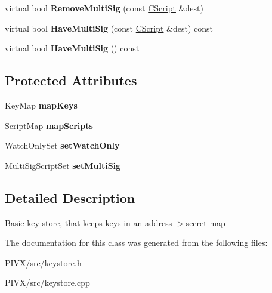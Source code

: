 \begin{DoxyCompactItemize}
\mbox{\label{class_c_basic_key_store_afebb995b8c69e4123bf1962f2de9cc52}} 
virtual bool {\bfseries Remove\+Multi\+Sig} (const \mbox{\hyperlink{class_c_script}{C\+Script}} \&dest)
\item 
\mbox{\label{class_c_basic_key_store_aeed4e62f08102fa2b1f6db4ec07b2bf3}} 
virtual bool {\bfseries Have\+Multi\+Sig} (const \mbox{\hyperlink{class_c_script}{C\+Script}} \&dest) const
\item 
\mbox{\label{class_c_basic_key_store_a5ad58081dedd56a2706b8dcca96460d0}} 
virtual bool {\bfseries Have\+Multi\+Sig} () const
\end{DoxyCompactItemize}
\subsection*{Protected Attributes}
\begin{DoxyCompactItemize}
\item 
\mbox{\label{class_c_basic_key_store_ac520003e5c3d863bf71fde247c6e0672}} 
Key\+Map {\bfseries map\+Keys}
\item 
\mbox{\label{class_c_basic_key_store_a8e9fa81382129c1535a0ee7b0d9c8f3b}} 
Script\+Map {\bfseries map\+Scripts}
\item 
\mbox{\label{class_c_basic_key_store_ac3391cb491e315403ad9af6afd1313da}} 
Watch\+Only\+Set {\bfseries set\+Watch\+Only}
\item 
\mbox{\label{class_c_basic_key_store_abf343356a152df521b10941b8daa72cf}} 
Multi\+Sig\+Script\+Set {\bfseries set\+Multi\+Sig}
\end{DoxyCompactItemize}


\subsection{Detailed Description}
Basic key store, that keeps keys in an address-\/$>$secret map 

The documentation for this class was generated from the following files\+:\begin{DoxyCompactItemize}
\item 
P\+I\+V\+X/src/keystore.\+h\item 
P\+I\+V\+X/src/keystore.\+cpp\end{DoxyCompactItemize}
